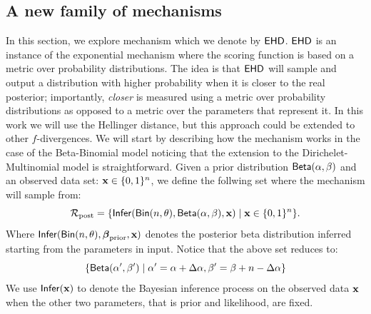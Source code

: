 \documentclass{article}
\begin{document}
\subsection{A new family of mechanisms}
\label{sec_exp}
In this section, we explore  mechanism which we denote by $\mathsf{EHD}$. $\mathsf{EHD}$ is an instance
of the exponential mechanism \cite{talwar} where the scoring function is based on a metric over
probability distributions.
The idea is that $\mathsf{EHD}$ will sample and output a distribution with higher probability when
it is closer to the real posterior; importantly,  \emph{closer} is measured using a metric over probability
distributions as opposed to a metric over the parameters that represent it. In this work we will
use the Hellinger distance, but this approach could be extended to other $f$-divergences. We will
start by describing how the mechanism works in the case of the Beta-Binomial model noticing that
the extension to the Dirichelet-Multinomial model is straightforward.
Given a prior distribution $\mathsf{Beta}(\alpha, \beta)$ and an observed data set: $\textbf{x}\in\{0,1\}^n$,
we define the follwing set  where the mechanism will sample from:
\[
  \mathcal{R}_{\textup{post}}=\{\mathsf{Infer}(\mathsf{Bin}(n, \theta), \mathsf{Beta}(\alpha, \beta),\textbf{x})\mid \textbf{x} \in \{0,1\}^n\}.
\]
Where $\mathsf{Infer}(\mathsf{Bin}(n, \theta), \boldsymbol{\beta}_{\textup{prior}},\textbf{x})$ denotes the posterior beta distribution inferred starting from the parameters in input.
Notice that the above set reduces to:
\[
  \{\mathsf{Beta}(\alpha',\beta')\mid \alpha'=\alpha + \Delta\alpha, \beta'=\beta + n-\Delta\alpha\}
\]
We use $\mathsf{Infer}(\textbf{x})$ to denote the Bayesian inference process on the observed data $\textbf{x}$
when the other two parameters, that is prior and likelihood, are fixed. 
\end{document}
